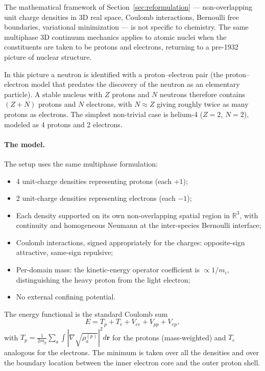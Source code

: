 \documentclass[11pt]{article}
\begin{document}
The mathematical framework of Section~\ref{sec:reformulation} --- non-overlapping unit charge densities in 3D real space, Coulomb interactions, Bernoulli free boundaries, variational minimization --- is not specific to chemistry. The same multiphase 3D continuum mechanics applies to atomic nuclei when the constituents are taken to be protons and electrons, returning to a pre-1932 picture of nuclear structure.

In this picture a neutron is identified with a proton--electron pair (the proton--electron model that predates the discovery of the neutron as an elementary particle). A stable nucleus with $Z$ protons and $N$ neutrons therefore contains $(Z+N)$ protons and $N$ electrons, with $N \approx Z$ giving roughly twice as many protons as electrons. The simplest non-trivial case is helium-4 ($Z=2$, $N=2$), modeled as 4 protons and 2 electrons.

\paragraph{The model.}
The setup uses the same multiphase formulation:
\begin{itemize}
\item 4 unit-charge densities representing protons (each $+1$);
\item 2 unit-charge densities representing electrons (each $-1$);
\item Each density supported on its own non-overlapping spatial region in $\mathbb{R}^3$, with continuity and homogeneous Neumann at the inter-species Bernoulli interface;
\item Coulomb interactions, signed appropriately for the charges: opposite-sign attractive, same-sign repulsive;
\item Per-domain mass: the kinetic-energy operator coefficient is $\propto 1/m_i$, distinguishing the heavy proton from the light electron;
\item No external confining potential.
\end{itemize}

The energy functional is the standard Coulomb sum
\begin{equation}
E = T_p + T_e + V_{ee} + V_{pp} + V_{ep},
\end{equation}
with $T_p = \tfrac{1}{2 m_p} \sum_a \int |\nabla \sqrt{\rho_a^{(p)}}|^2 d\mathbf{r}$ for the protons (mass-weighted) and $T_e$ analogous for the electrons. The minimum is taken over all the densities and over the boundary location between the inner electron core and the outer proton shell.
\end{document}
